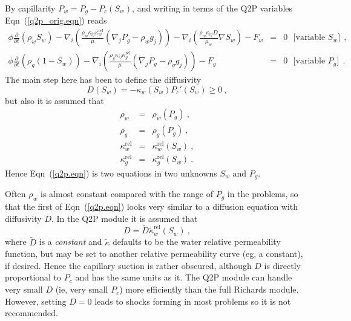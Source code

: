 \documentclass[]{scrreprt}
\begin{document}
By capillarity $P_{w} = P_{g} - P_{c}(S_{w})$, and writing in terms of
the Q2P variables Eqn~(\ref{q2p_orig.eqn}) reads
\begin{eqnarray}
\phi \frac{\partial}{\partial t} \left( \rho_{w} S_{w} \right) - \nabla_{i}
\left( \frac{\rho_{w} \kappa_{ij}\kappa_{w}^{\mathrm{rel}}}{\mu}
(\nabla_{j}P_{g} - \rho_{w} g_{j}) \right) - \nabla_{i}\left(
\frac{\rho_{w}\kappa_{ij}D}{\mu_{w}} \nabla S_{w} \right)
- F_{w} & = & 0 \ \ \ \mbox{[variable $S_{w}$]}\ \ , \nonumber \\
\phi \frac{\partial}{\partial t} \left( \rho_{g} (1 - S_{w}) \right) - \nabla_{i}
\left( \frac{\rho_{g} \kappa_{ij}\kappa_{g}^{\mathrm{rel}}}{\mu} (\nabla_{j}P_{g} - \rho_{g} g_{j}) \right)
- F_{g} & = & 0 \ \ \ \mbox{[variable $P_{g}$]}\ \ .
\label{q2p.eqn}
\end{eqnarray}
The main step here has been to define the diffusivity
\begin{equation}
D(S_{w}) = -\kappa_{w}(S_{w})P_{c}'(S_{w}) \geq 0 \ ,
\end{equation}
but also it is assumed that
\begin{eqnarray}
\rho_{w} & = & \rho_{w}(P_{g}) \ , \nonumber \\
\rho_{g} & = & \rho_{g}(P_{g}) \ , \nonumber \\
\kappa_{w}^{\mathrm{rel}} & = & \kappa_{w}^{\mathrm{rel}}(S_{w}) \ ,
\nonumber \\
\kappa_{g}^{\mathrm{rel}} & = & \kappa_{g}^{\mathrm{rel}}(S_{w}) \ .
\end{eqnarray}
Hence Eqn~(\ref{q2p.eqn}) is two equations in two unknowns $S_{w}$ and
$P_{g}$.

Often $\rho_{w}$ is almost constant compared with the range of $P_{g}$
in the problems, so that the first of Eqn~(\ref{q2p.eqn}) looks very
similar to a diffusion equation with diffusivity $D$.  In the Q2P
module it is assumed that
\begin{equation}
D = \tilde{D}\tilde{\kappa}^{\mathrm{rel}}_{w}(S_{w})
\ ,
\label{diffusivity.eqn}
\end{equation}
where $\tilde{D}$ is a {\em constant} and $\tilde{\kappa}$ defaults to
be the water relative permeability function, but may be set to another
relative permeability curve (eg, a constant), if desired.
Hence the capillary suction is rather obscured,
although $D$ is directly proportional to $P_{c}$ and has the same
units as it.  The Q2P module can handle very small $D$ (ie, very small
$P_{c}$) more efficiently than the full Richards module.  However,
setting $D=0$ leads to shocks forming in most problems so it is not
recommended.
\end{document}
